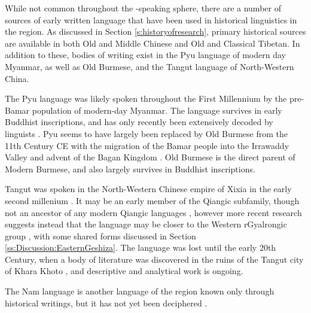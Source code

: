 {While not common throughout the \lfam-speaking sphere, there are a number of sources of early written language that have been used in historical linguistics in the region. As discussed in Section \ref{s:historyofresearch}, primary historical sources are available in both Old and Middle Chinese and Old and Classical Tibetan. In addition to these, bodies of writing exist in the Pyu language of modern day Myanmar, as well as Old Burmese, and the Tangut language of North-Western China.

The Pyu language was likely spoken throughout the First Millennium  by the pre-Bamar population of modern-day Myanmar. The language survives in early Buddhist inscriptions, and has only recently been extensively decoded by linguists \cites{Griffiths2017}{Miyake2019}. Pyu seems to have largely been replaced by Old Burmese from the 11th Century CE with the migration of the Bamar people into the Irrawaddy Valley and advent of the Bagan Kingdom \cites{Wheatley2017}{Griffiths2017}. Old Burmese is the direct parent of Modern Burmese, and also largely survives in Buddhist inscriptions.

Tangut was spoken in the North-Western Chinese empire of Xixia in the early second millenium \cite{Gong2017}. It may be an early member of the Qiangic subfamily, though not an ancestor of any modern Qiangic languages \cite{Matisoff2004}, however more recent research suggests instead that the language may be closer to the Western rGyalrongic group \cite{Lai2020}, with some shared forms discussed in Section \ref{ss:Discussion:EasternGeshiza}. The language was lost until the early 20th Century, when a body of literature was discovered in the ruins of the Tangut city of Khara Khoto \cite{Gong2017}, and descriptive and analytical work is ongoing.

The Nam language is another language of the region known only through historical writings, but it has not yet been deciphered \cite{Ikeda2012}.

}
